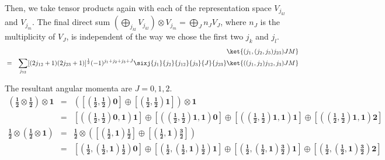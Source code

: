 \documentclass{article}
\begin{document}
Then, we take tensor products again with each of the representation space $V_{j_{kl}}$ and $V_{j_{m}}$.
The final direct sum $\left(\bigoplus\limits_{j_{kl}} V_{j_{kl}}\right) \otimes V_{j_{m}} = \bigoplus\limits_{J} n_{J}V_{J}$, where $n_{J}$ is the multiplicity of $V_{J}$, is independent of the way we chose the first two $j_{k}$ and $j_{l}$.
\begin{eqnarray}
&  & \ket{(j_1,(j_2,j_3)j_{23})JM}  \nonumber \\
& = & \sum_{j_{12}} [(2j_{12}+1)(2j_{23}+1)]^{\frac{1}{2}}(-1)^{j_1+j_2+j_3+J}\sixj{j_1}{j_2}{j_{12}}{j_3}{J}{j_{23}} \ket{((j_1,j_2)j_{12},j_3)JM}
\end{eqnarray}

\begin{example}
The resultant angular momenta are $J = 0, 1,2$.
\begin{eqnarray}
\left(\mathbf{\frac{1}{2}} \otimes \mathbf{\frac{1}{2}} \right) \otimes \mathbf{1}  
    & = & \mathbf{ \left(\left[\left(\frac{1}{2},\frac{1}{2}\right) 0 \right] \oplus \left[\left(\frac{1}{2},\frac{1}{2}\right) 1 \right]\right) \otimes 1}\nonumber\\
    & = & \mathbf{  \left[\left(\left(\frac{1}{2},\frac{1}{2}\right) 0, 1 \right) 1 \right] \oplus \left[\left(\left(\frac{1}{2},\frac{1}{2}\right) 1, 1 \right) 0 \right] \oplus \left[\left(\left(\frac{1}{2}, \frac{1}{2}\right) 1, 1 \right) 1 \right] \oplus \left[\left(\left(\frac{1}{2}, \frac{1}{2}\right) 1, 1 \right) 2 \right]} \nonumber
\end{eqnarray}
\begin{eqnarray}
\mathbf{\frac{1}{2}} \otimes \left( \mathbf{\frac{1}{2}}  \otimes \mathbf{1} \right) 
    & = & \mathbf{\frac{1}{2} \otimes\left(\left[\left(\frac{1}{2}, 1\right) \frac{1}{2} \right] \oplus \left[\left(\frac{1}{2}, 1 \right) \frac{3}{2} \right]\right) }\nonumber\\
    & = & \mathbf{ \left[\left(\frac{1}{2}, \left(\frac{1}{2}, 1 \right) \frac{1}{2} \right) 0\right] \oplus \left[\left(\frac{1}{2}, \left(\frac{1}{2}, 1\right) \frac{1}{2} \right) 1 \right] \oplus \left[\left( \frac{1}{2}, \left(\frac{1}{2}, 1 \right) \frac{3}{2} \right) 1 \right] \oplus \left[\left(\frac{1}{2}, \left(\frac{1}{2}, 1 \right) \frac{3}{2} \right) 2 \right] }\nonumber
\end{eqnarray}
\end{example}
\end{document}
